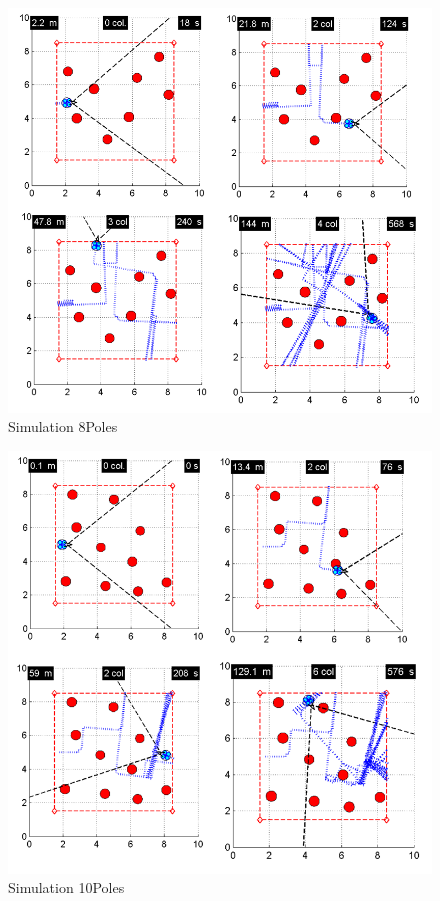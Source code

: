 \begin{figure}[h]
\includegraphics[width=0.8\linewidth]{Figures/Simulation_8Poles.png}
\centering
\caption{Simulation 8Poles}
\label{f:Simulation_8Poles}
\end{figure}

\begin{figure}[h]
\includegraphics[width=0.8\linewidth]{Figures/Simulation_10Poles.png}
\centering
\caption{Simulation 10Poles}
\label{f:Simulation_10Poles}
\end{figure}
